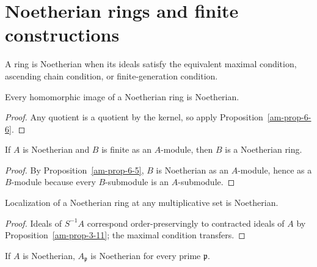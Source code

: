 \section{Noetherian rings and finite constructions}
\label{am-ch7-noetherian}
\begin{definition}
\label{am-def-noetherian-ring}
\uses{}
A ring is Noetherian when its ideals satisfy the equivalent maximal condition,
ascending chain condition, or finite-generation condition.
\end{definition}
\begin{proposition}[Quotients]
\label{am-prop-7-1}
\uses{}
Every homomorphic image of a Noetherian ring is Noetherian.
\end{proposition}
\begin{proof}
Any quotient is a quotient by the kernel, so apply Proposition~\ref{am-prop-6-6}.
\end{proof}
\begin{proposition}
\label{am-prop-7-2}
\uses{}
If $A$ is Noetherian and $B$ is finite as an $A$-module, then $B$ is a
Noetherian ring.
\end{proposition}
\begin{proof}
By Proposition~\ref{am-prop-6-5}, $B$ is Noetherian as an $A$-module, hence as
a $B$-module because every $B$-submodule is an $A$-submodule.
\end{proof}
\begin{proposition}[Localization]
\label{am-prop-7-3}
\uses{}
Localization of a Noetherian ring at any multiplicative set is Noetherian.
\end{proposition}
\begin{proof}
Ideals of $S^{-1}A$ correspond order-preservingly to contracted ideals of $A$
by Proposition~\ref{am-prop-3-11}; the maximal condition transfers.
\end{proof}
\begin{corollary}
\label{am-cor-7-4}
\uses{}
If $A$ is Noetherian, $A_\mathfrak{p}$ is Noetherian for every prime $\mathfrak{p}$.
\end{corollary}
